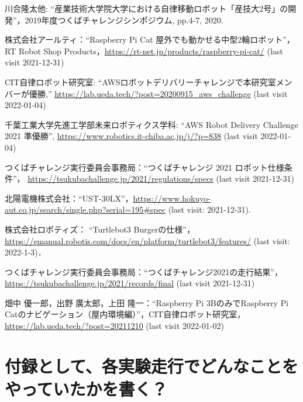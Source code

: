 \documentclass[twocolumn,9pt]{jsproceedings}
\begin{document}
\begin{thebibliography}{99}
  川合隆太他: ``産業技術大学院大学における自律移動ロボット「産技大2号」の開発''，2019年度つくばチャレンジシンポジウム, pp.4-7, 2020.

  株式会社アールティ：``Raspberry Pi Cat 屋外でも動かせる中型2輪ロボット''，
  RT Robot Shop Products，\url{https://rt-net.jp/products/raspberry-pi-cat/} (last visit 2021-12-31)

	  CIT自律ロボット研究室: ``AWSロボットデリバリーチャレンジで本研究室メンバーが優勝,'' \url{https://lab.ueda.tech/?post=20200915_aws_challenge} (last visit 2022-01-04)

	  千葉工業大学先進工学部未来ロボティクス学科: ``AWS Robot Delivery Challenge 2021 準優勝'', \url{https://www.robotics.it-chiba.ac.jp/j/?p=838} (last visit 2022-01-04)
  
  つくばチャレンジ実行委員会事務局：``つくばチャレンジ 2021 ロボット仕様条件''，
  \url{https://tsukubachallenge.jp/2021/regulations/specs} (last visit 2021-12-31)
  
  北陽電機株式会社：``UST-30LX''，\url{https://www.hokuyo-aut.co.jp/search/single.php?serial=195#spec} (last visit: 2021-12-31).
  
  株式会社ロボティズ： ``Turtlebot3 Burgerの仕様''，\url{https://emanual.robotis.com/docs/en/platform/turtlebot3/features/} (last visit: 2022-1-3)．
  
  つくばチャレンジ実行委員会事務局：``つくばチャレンジ2021の走行結果''，
  \url{https://tsukubachallenge.jp/2021/records/final} (last visit 2021-12-31)

	  畑中 優一郎，出野 廣太郎，上田 隆一：``Raspberry Pi 3BのみでRaspberry Pi Catのナビゲーション（屋内環境編）''，CIT自律ロボット研究室，\url{https://lab.ueda.tech/?post=20211210} (last visit 2022-01-02)
\end{thebibliography}
\normalsize

\clearpage

\section{付録として、各実験走行でどんなことをやっていたかを書く？}
\end{document}

